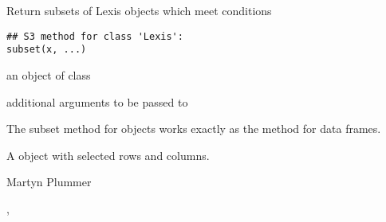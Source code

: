 \begin{Description}\relax
Return subsets of Lexis objects which meet conditions
\end{Description}
\begin{Usage}
\begin{verbatim}
## S3 method for class 'Lexis':
subset(x, ...)
\end{verbatim}
\end{Usage}
\begin{Arguments}
\begin{ldescription}
\item[\code{x}] an object of class 
\item[\code{...}] additional arguments to be passed to 
\end{ldescription}
\end{Arguments}
\begin{Details}\relax
The subset method for  objects works exactly as the
method for data frames.
\end{Details}
\begin{Value}
A  object with selected rows and columns.
\end{Value}
\begin{Author}\relax
Martyn Plummer
\end{Author}
\begin{SeeAlso}\relax
{}, 
\end{SeeAlso}

